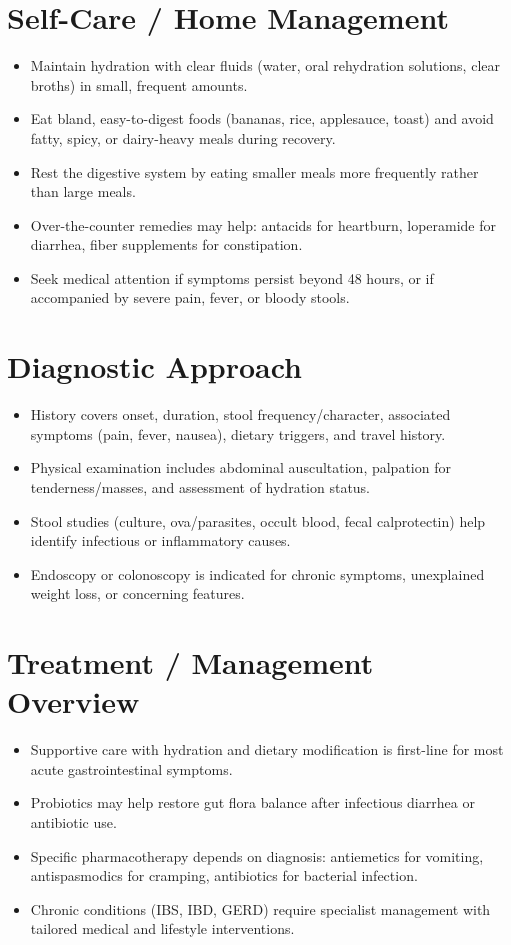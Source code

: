 \section*{Self-Care / Home Management}
\begin{itemize}
  \item Maintain hydration with clear fluids (water, oral rehydration solutions, clear broths) in small, frequent amounts.
  \item Eat bland, easy-to-digest foods (bananas, rice, applesauce, toast) and avoid fatty, spicy, or dairy-heavy meals during recovery.
  \item Rest the digestive system by eating smaller meals more frequently rather than large meals.
  \item Over-the-counter remedies may help: antacids for heartburn, loperamide for diarrhea, fiber supplements for constipation.
  \item Seek medical attention if symptoms persist beyond 48 hours, or if accompanied by severe pain, fever, or bloody stools.
\end{itemize}

\section*{Diagnostic Approach}
\begin{itemize}
  \item History covers onset, duration, stool frequency/character, associated symptoms (pain, fever, nausea), dietary triggers, and travel history.
  \item Physical examination includes abdominal auscultation, palpation for tenderness/masses, and assessment of hydration status.
  \item Stool studies (culture, ova/parasites, occult blood, fecal calprotectin) help identify infectious or inflammatory causes.
  \item Endoscopy or colonoscopy is indicated for chronic symptoms, unexplained weight loss, or concerning features.
\end{itemize}

\section*{Treatment / Management Overview}
\begin{itemize}
  \item Supportive care with hydration and dietary modification is first-line for most acute gastrointestinal symptoms.
  \item Probiotics may help restore gut flora balance after infectious diarrhea or antibiotic use.
  \item Specific pharmacotherapy depends on diagnosis: antiemetics for vomiting, antispasmodics for cramping, antibiotics for bacterial infection.
  \item Chronic conditions (IBS, IBD, GERD) require specialist management with tailored medical and lifestyle interventions.
\end{itemize}

\clearpage
